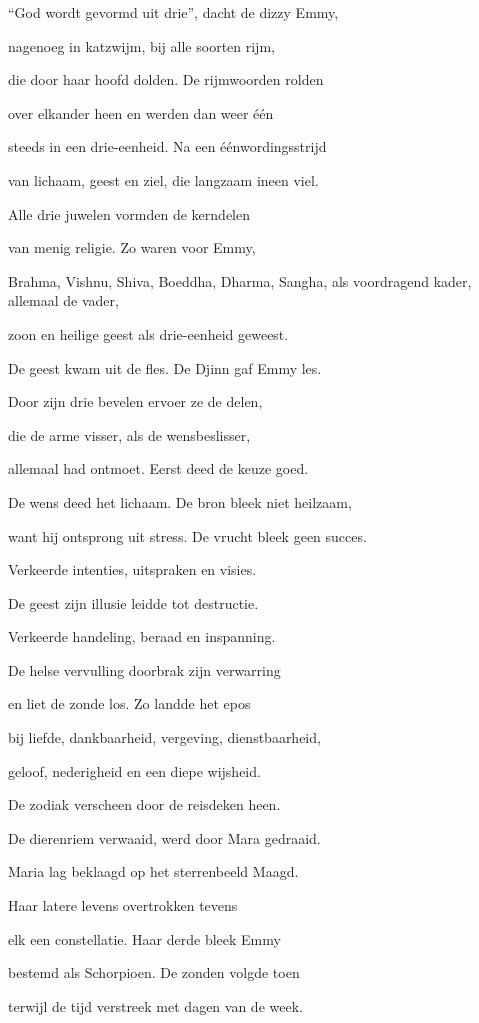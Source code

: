 “God wordt gevormd uit drie”,
dacht de dizzy Emmy,

nagenoeg in katzwijm,
bij alle soorten rijm,

die door haar hoofd dolden.
De rijmwoorden rolden

over elkander heen
en werden dan weer één

steeds in een drie-eenheid.
Na een éénwordingsstrijd

van lichaam, geest en ziel,
die langzaam ineen viel.

Alle drie juwelen
vormden de kerndelen

van menig religie.
Zo waren voor Emmy,

Brahma, Vishnu, Shiva,
Boeddha, Dharma, Sangha,
als voordragend kader,
allemaal de vader,

zoon en heilige geest
als drie-eenheid geweest.

De geest kwam uit de fles.
De Djinn gaf Emmy les.

Door zijn drie bevelen
ervoer ze de delen,

die de arme visser,
als de wensbeslisser,

allemaal had ontmoet.
Eerst deed de keuze goed.

De wens deed het lichaam.
De bron bleek niet heilzaam,

want hij ontsprong uit stress.
De vrucht bleek geen succes.

Verkeerde intenties,
uitspraken en visies.

De geest zijn illusie
leidde tot destructie.

Verkeerde handeling,
beraad en inspanning.

De helse vervulling
doorbrak zijn verwarring

en liet de zonde los.
Zo landde het epos

bij liefde, dankbaarheid,
vergeving, dienstbaarheid,

geloof, nederigheid
en een diepe wijsheid.

De zodiak verscheen
door de reisdeken heen.

De dierenriem verwaaid,
werd door Mara gedraaid.

Maria lag beklaagd
op het sterrenbeeld Maagd.

Haar latere levens
overtrokken tevens

elk een constellatie.
Haar derde bleek Emmy

bestemd als Schorpioen.
De zonden volgde toen

terwijl de tijd verstreek
met dagen van de week.

